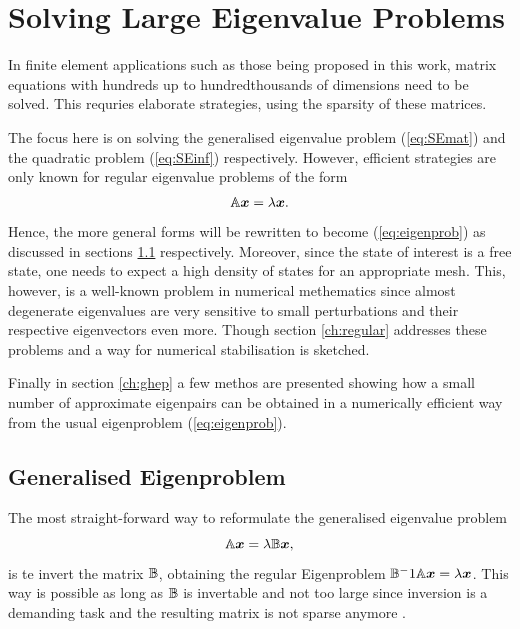 \section{Solving Large Eigenvalue Problems}
In finite element applications such as those being proposed in this work, matrix equations with hundreds up to hundredthousands of dimensions need to be solved.
This requries elaborate strategies, using the sparsity of these matrices.

The focus here is on solving the generalised eigenvalue problem (\ref{eq:SEmat}) and the quadratic problem (\ref{eq:SEinf}) respectively.
However, efficient strategies are only known for regular eigenvalue problems of the form 
\begin{equation} \label{eq:eigenprob}
\mathbb{A}\bm{x}=\lambda\bm{x}.
\end{equation}
Hence, the more general forms will be rewritten to become (\ref{eq:eigenprob}) as discussed in sections \ref{ch:GenEV} respectively.
Moreover, since the state of interest is a free state, one needs to expect a high density of states for an appropriate mesh. 
This, however, is a well-known problem in numerical methematics since almost degenerate eigenvalues are very sensitive to small perturbations and their respective eigenvectors even more.
Though section \ref{ch:regular} addresses these problems and a way for numerical stabilisation is sketched.

Finally in section \ref{ch:ghep} a few methos are presented showing how a small number of approximate eigenpairs can be obtained in a numerically efficient way from the usual eigenproblem (\ref{eq:eigenprob}).

%

\subsection{Generalised Eigenproblem}
\label{ch:GenEV}
The most straight-forward way to reformulate the generalised eigenvalue problem
\begin{equation} \label{eq:Gep}
\mathbb{A}\bm{x}=\lambda\mathbb{B}\bm{x},
\end{equation}
is te invert the matrix $\mathbb{B}$, obtaining the regular Eigenproblem $\mathbb{B}^-1\mathbb{A}\bm{x}=\lambda\bm{x}$.
This way is possible as long as $\mathbb{B}$ is invertable and not too large since inversion is a demanding task and the resulting matrix is not sparse anymore \cite{slepcManual}.

